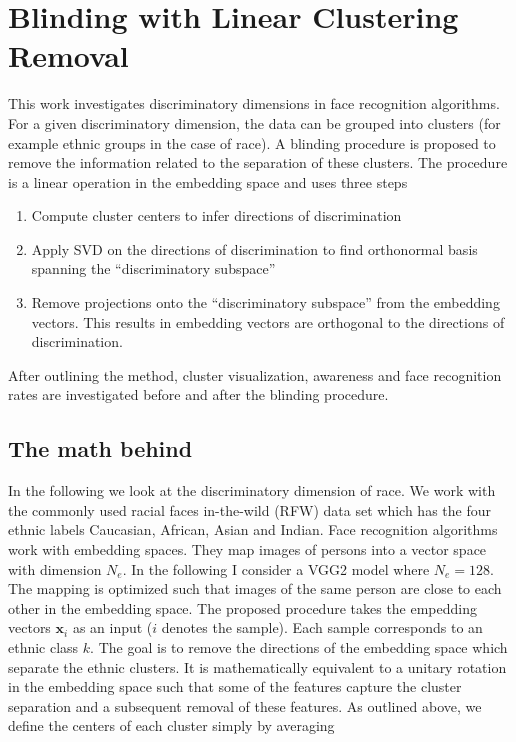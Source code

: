 \documentclass{report}
\begin{document}
\chapter{Blinding with Linear Clustering Removal}
\author{Samuel Wehrli}
\date{\today}

This work investigates discriminatory dimensions in face recognition algorithms. For a given discriminatory dimension, the data can be grouped into clusters (for example ethnic groups in the case of race). A blinding procedure is proposed to remove the information related to the separation of these clusters. The procedure is a linear operation in the embedding space and uses three steps

\begin{enumerate}
	\item Compute cluster centers to infer directions of discrimination 
	\item Apply SVD on the directions of discrimination to find orthonormal basis spanning the ``discriminatory subspace'' 
	\item Remove projections onto the ``discriminatory subspace'' from the embedding vectors. This results in embedding vectors are orthogonal to the directions of discrimination.
\end{enumerate} 

\noindent After outlining the method,  cluster visualization, awareness and face recognition rates are investigated before and after the blinding procedure.

\section{The math behind}

In the following we look at the discriminatory dimension of race. We work with the commonly used racial faces in-the-wild (RFW) data set which has the four ethnic labels Caucasian, African, Asian and Indian. Face recognition algorithms work with embedding spaces. They map images of persons into a vector space with dimension $N_e$. In the following I consider a VGG2 model where $N_e=128$. The mapping is optimized such that images of the same person are close to each other in the embedding space. The proposed procedure takes the empedding vectors $\bm{x}_i$ as an input ($i$ denotes the sample). Each sample corresponds to an ethnic class $k$. The goal is to remove the directions of the embedding space which separate the ethnic clusters. It is mathematically equivalent to a unitary rotation in the embedding space such that some of the features capture the cluster separation and a subsequent removal of these features. As outlined above, we define the centers of each cluster simply by averaging
\end{document}
